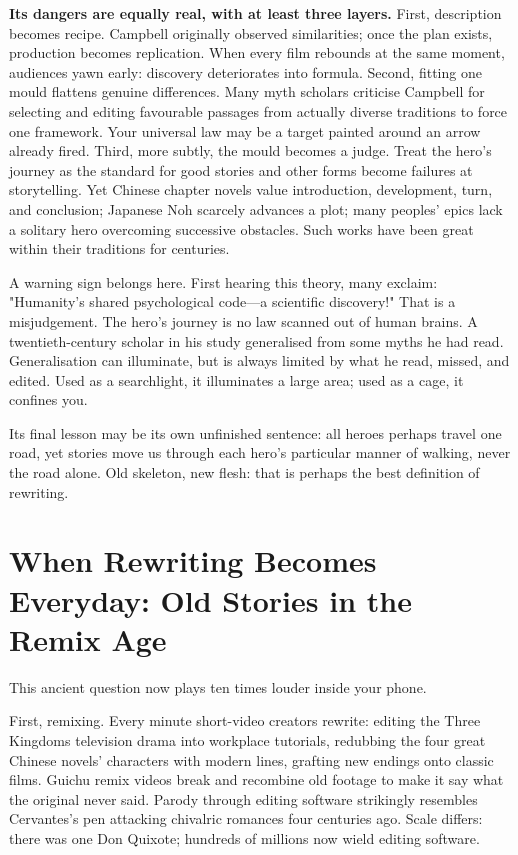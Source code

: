 \textbf{Its dangers are equally real, with at least three layers.} First, description becomes recipe. Campbell originally observed similarities; once the plan exists, production becomes replication. When every film rebounds at the same moment, audiences yawn early: discovery deteriorates into formula. Second, fitting one mould flattens genuine differences. Many myth scholars criticise Campbell for selecting and editing favourable passages from actually diverse traditions to force one framework. Your universal law may be a target painted around an arrow already fired. Third, more subtly, the mould becomes a judge. Treat the hero's journey as the standard for good stories and other forms become failures at storytelling. Yet Chinese chapter novels value introduction, development, turn, and conclusion; Japanese Noh scarcely advances a plot; many peoples' epics lack a solitary hero overcoming successive obstacles. Such works have been great within their traditions for centuries.

A warning sign belongs here. First hearing this theory, many exclaim: "Humanity's shared psychological code---a scientific discovery!" That is a misjudgement. The hero's journey is no law scanned out of human brains. A twentieth-century scholar in his study generalised from some myths he had read. Generalisation can illuminate, but is always limited by what he read, missed, and edited. Used as a searchlight, it illuminates a large area; used as a cage, it confines you.

Its final lesson may be its own unfinished sentence: all heroes perhaps travel one road, yet stories move us through each hero's particular manner of walking, never the road alone. Old skeleton, new flesh: that is perhaps the best definition of rewriting.

\section[Old Stories in the Remix Age]{When Rewriting Becomes Everyday: Old Stories in the Remix Age}
This ancient question now plays ten times louder inside your phone.

First, remixing. Every minute short-video creators rewrite: editing the Three Kingdoms television drama into workplace tutorials, redubbing the four great Chinese novels' characters with modern lines, grafting new endings onto classic films. Guichu remix videos break and recombine old footage to make it say what the original never said. Parody through editing software strikingly resembles Cervantes's pen attacking chivalric romances four centuries ago. Scale differs: there was one Don Quixote; hundreds of millions now wield editing software.

